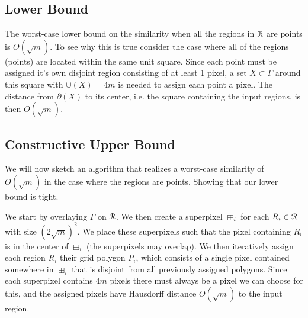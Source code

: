\documentclass[a4paper,UKenglish,cleveref]{lipics-v2019}
\newcommand{\spix}{\boxplus}
\begin{document}




\subsection{Lower Bound}
\label{sub:points_lower}
The worst-case lower bound on the similarity when all the regions in \(\cal R\) are points is \(O(\sqrt{m})\). To see why this is true consider the case where all of the regions (points) are located within the same unit square. Since each point must be assigned it's own disjoint region consisting of at least 1 pixel, a set \(X \subset \Gamma\) around this square with \(\cup(X)=4m\) is needed to assign each point a pixel. The distance from \(\partial(X)\) to its center, i.e. the square containing the input regions, is then \(O(\sqrt{m})\).


\subsection{Constructive Upper Bound}
\label{sub:points_upper}
We will now sketch an algorithm that realizes a worst-case similarity of \(O(\sqrt{m})\) in the case where the regions are points. Showing that our lower bound is tight.

We start by overlaying \(\Gamma\) on \(\cal R\). We then create a superpixel \(\spix_i\) for each \(R_i \in \cal R\) with size \((2\sqrt{m})^2\). We place these superpixels such that the pixel containing \(R_i\) is in the center of \(\spix_i\) (the superpixels may overlap). We then iteratively assign each region \(R_i\) their grid polygon \(P_i\), which consists of a single pixel contained somewhere in \(\spix_i\) that is disjoint from all previously assigned polygons. Since each superpixel contains \(4m\) pixels there must always be a pixel we can choose for this, and the assigned pixels have Hausdorff distance \(O(\sqrt{m})\) to the input region. 


\label{sub:points_algo}
\end{document}
